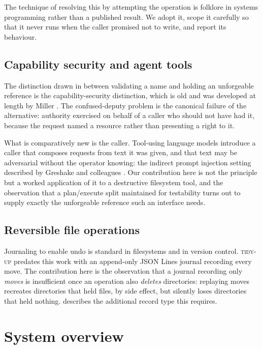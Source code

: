 \documentclass[11pt,a4paper]{article}
\newcommand{\tool}{\textsc{tidy-up}}
\begin{document}
The technique of resolving this by attempting the operation is folklore in systems
programming rather than a published result. We adopt it, scope it carefully so that it
never runs when the caller promised not to write, and report its behaviour.

\subsection{Capability security and agent tools}

The distinction drawn in  between validating a name
and holding an unforgeable reference is the capability-security distinction,
which is old \cite{dennis1966} and was developed at length by Miller
\cite{miller2006}. The confused-deputy problem \cite{hardy1988} is the
canonical failure of the alternative: authority exercised on behalf of a caller
who should not have had it, because the request named a resource rather than
presenting a right to it.

What is comparatively new is the caller. Tool-using language models introduce a
caller that composes requests from text it was given, and that text may be
adversarial without the operator knowing: the indirect prompt injection setting
described by Greshake and colleagues \cite{greshake2023}. Our contribution here
is not the principle but a worked application of it to a destructive filesystem
tool, and the observation that a plan/execute split maintained for testability
turns out to supply exactly the unforgeable reference such an interface needs.

\subsection{Reversible file operations}

Journaling to enable undo is standard in filesystems and in version control. \tool{}
predates this work with an append-only JSON Lines journal recording every move. The
contribution here is the observation that a journal recording only \emph{moves} is
insufficient once an operation also \emph{deletes} directories: replaying moves
recreates directories that held files, by side effect, but silently loses directories
that held nothing.  describes the additional record type this
requires.

\section{System overview}
\label{sec:overview}
\end{document}

